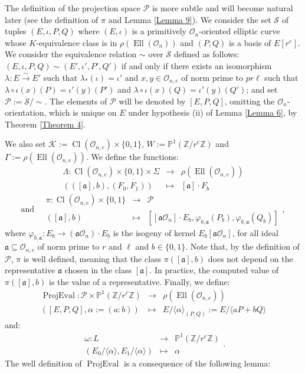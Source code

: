 \documentclass[a4paper,10pt]{report}
\theoremstyle{definition}
\theoremstyle{plain}
\theoremstyle{definition}
\newcommand{\Z}{\mathbb{Z}}
\newcommand{\m}[1]{\mathcal{#1}}
\newcommand{\mO}{\mathcal{O}}
\renewcommand{\(}{\left(}
\renewcommand{\)}{\right)}
\renewcommand{\P}{\mathbb{P}}
\newcommand{\mf}[1]{\mathfrak{#1}}
\DeclareMathOperator{\Cl}{Cl}
\DeclareMathOperator{\Ell}{Ell}
\DeclareMathOperator{\ProjEval}{ProjEval}
\begin{document}
The definition of the projection space $\m{P}$ is more subtle and will become natural later (see the definition of $\pi$ and Lemma \ref{Lemma 9}). We consider the set $\m{S}$ of tuples $(E,\iota,P,Q)$ where $(E,\iota)$ is a primitively $\mO_n$-oriented elliptic curve whose $K$-equivalence class is in $\rho(\Ell(\mO_n))$ and $(P,Q)$ is a basis of $E[r^e]$. We consider the equivalence relation $\sim$ over $\m{S}$ defined as follows: $(E,\iota,P,Q)\sim (E',\iota',P',Q')$ if and only if there exists an isomorphism $\lambda : E\overset{\sim}{\longrightarrow} E'$ such that $\lambda_*(\iota)=\iota'$ and $x, y\in\mO_{n,e}$ of norm prime to $p r\ell$ such that $\lambda\circ\iota(x)(P)=\iota'(y)(P')$ and $\lambda\circ\iota(x)(Q)=\iota'(y)(Q')$; and set $\m{P}:=\m{S}/\sim$. The elements of $\m{P}$ will be denoted by $[E,P,Q]$, omitting the $\mO_n$-orientation, which is unique on $E$ under hypothesis (ii) of Lemma \ref{Lemma 6}, by Theorem \ref{Theorem 4}. 

We also set $\m{K}:=\Cl(\mO_{n,e})\times\{0,1\}$, $W:=\P^1(\Z/r^e\Z)$ and $\Gamma:=\rho(\Ell(\mO_{n,e}))$. We define the functions:
\[\begin{array}{rcl}
\Lambda : \Cl(\mO_{n,e})\times\{0,1\}\times \Sigma & \longrightarrow & \rho(\Ell(\mO_{n,e}))\\
(([\mf{a}], b),(F_0,F_1)) & \longmapsto & [\mf{a}]\cdot F_b
\end{array}\]
\[\mbox{and} \quad \begin{array}{rcl}
\pi : \Cl(\mO_{n,e})\times\{0,1\} & \longrightarrow & \m{P}\\
([\mf{a}], b) & \longmapsto & [[\mf{a}\mO_n]\cdot E_b,\varphi_{b,\mf{a}}(P_b),\varphi_{b,\mf{a}}(Q_b)]
\end{array},\]
where $\varphi_{b,\mf{a}}: E_b\longrightarrow (\mf{a}\mO_n)\cdot E_b$ is the isogeny of kernel $E_b[\mf{a}\mO_n]$, for all ideal $\mf{a}\subseteq\mO_{n,e}$ of norm prime to $r$ and $\ell$ and $b\in\{0,1\}$. Note that, by the definition of $\m{P}$, $\pi$ is well defined, meaning that the class $\pi([\mf{a}],b)$ does not depend on the representative $\mf{a}$ chosen in the class $[\mf{a}]$.  In practice, the computed value of $\pi([\mf{a}],b)$ is the value of a representative. Finally, we define:
\[\begin{array}{rcl}
\ProjEval :\m{P}\times \P^1(\Z/r^e\Z) & \longrightarrow & \rho(\Ell(\mO_{n,e}))\\
([E,P,Q],\alpha:=(a:b)) & \longmapsto & E/\langle\alpha\rangle_{(P,Q)}:=E/\langle aP+bQ\rangle
\end{array}\]
and:
\[\begin{array}{rcl}
\omega : L & \longrightarrow & \P^1(\Z/r^e\Z)\\
(E_0/\langle\alpha\rangle,E_1/\langle\alpha\rangle) & \longmapsto & \alpha
\end{array}.\]
The well definition of $\ProjEval$ is a consequence of the following lemma:
\end{document}
